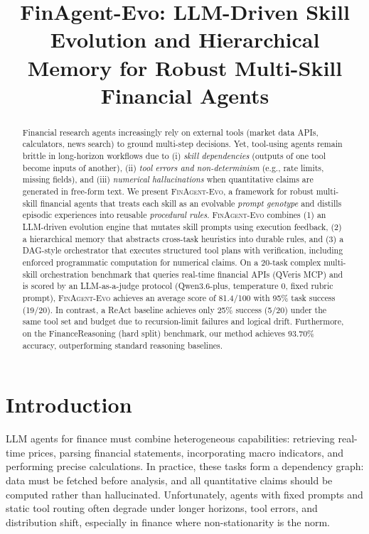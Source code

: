 \documentclass{article}
\title{FinAgent-Evo: LLM-Driven Skill Evolution and Hierarchical Memory for Robust Multi-Skill Financial Agents}
\author{}
\begin{document}
\maketitle

\begin{abstract}
Financial research agents increasingly rely on external tools (market data APIs, calculators, news search) to ground multi-step decisions. Yet, tool-using agents remain brittle in long-horizon workflows due to (i) \emph{skill dependencies} (outputs of one tool become inputs of another), (ii) \emph{tool errors and non-determinism} (e.g., rate limits, missing fields), and (iii) \emph{numerical hallucinations} when quantitative claims are generated in free-form text.
We present \textsc{FinAgent-Evo}, a framework for robust multi-skill financial agents that treats each skill as an evolvable \emph{prompt genotype} and distills episodic experiences into reusable \emph{procedural rules}.
\textsc{FinAgent-Evo} combines (1) an LLM-driven evolution engine that mutates skill prompts using execution feedback, (2) a hierarchical memory that abstracts cross-task heuristics into durable rules, and (3) a DAG-style orchestrator that executes structured tool plans with verification, including enforced programmatic computation for numerical claims.
On a 20-task complex multi-skill orchestration benchmark that queries real-time financial APIs (QVeris MCP) and is scored by an LLM-as-a-judge protocol (Qwen3.6-plus, temperature 0, fixed rubric prompt), \textsc{FinAgent-Evo} achieves an average score of 81.4/100 with 95\% task success (19/20). In contrast, a ReAct baseline achieves only 25\% success (5/20) under the same tool set and budget due to recursion-limit failures and logical drift. Furthermore, on the FinanceReasoning (hard split) benchmark, our method achieves 93.70\% accuracy, outperforming standard reasoning baselines.
\end{abstract}

\section{Introduction}
LLM agents for finance must combine heterogeneous capabilities: retrieving real-time prices, parsing financial statements, incorporating macro indicators, and performing precise calculations. In practice, these tasks form a dependency graph: data must be fetched before analysis, and all quantitative claims should be computed rather than hallucinated. Unfortunately, agents with fixed prompts and static tool routing often degrade under longer horizons, tool errors, and distribution shift, especially in finance where non-stationarity is the norm.
\end{document}
